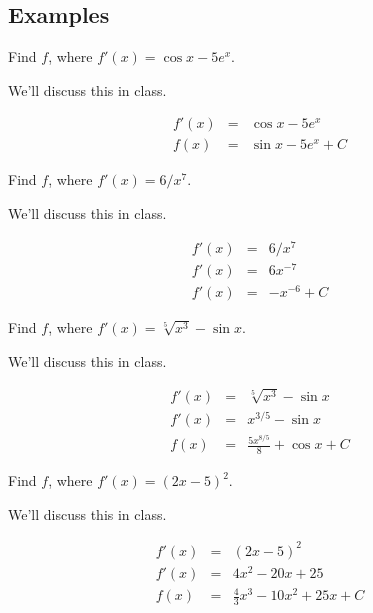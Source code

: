 \documentclass[12pt,addpoints, answers, fleqn]{exam}
\begin{document}
\subsection{Examples}
\begin{questions}
\question Find $f$, where $f'\left(x\right) = \cos x - 5e^x$.

\begin{solution}
We'll discuss this in class.

\begin{eqnarray*}
f'\left(x\right) &=& \cos x - 5e^x\\
f\left(x\right) &=& \sin x - 5e^x + C
\end{eqnarray*}

\end{solution}

\question Find $f$, where $f'\left(x\right) = 6/x^7$.

\begin{solution}
We'll discuss this in class.

\begin{eqnarray*}
f'\left(x\right) &=& 6/x^7\\
f'\left(x\right) &=& 6x^{-7}\\
f'\left(x\right) &=& -x^{-6}+C
\end{eqnarray*}
\end{solution}

\question Find $f$, where $f'\left(x\right) = \sqrt[5]{x^3} - \sin x$.

\begin{solution}
We'll discuss this in class.

\begin{eqnarray*}
f'\left(x\right) &=& \sqrt[5]{x^3} - \sin x\\
f'\left(x\right) &=& x^{3/5} - \sin x\\
f\left(x\right) &=& \frac{5x^{8/5}}{8} + \cos x + C
\end{eqnarray*}
\end{solution}

\question Find $f$, where $f'\left(x\right) = \left( 2x - 5 \right)^2$.

\begin{solution}
We'll discuss this in class.

\begin{eqnarray*}
f'\left(x\right) &=& \left( 2x - 5 \right)^2\\
f'\left(x\right) &=& 4x^2 -20x + 25\\
f\left(x\right) &=& \frac{4}{3}x^3 -10x^2 + 25x + C
\end{eqnarray*}
\end{solution}


\end{questions}
\end{document}
